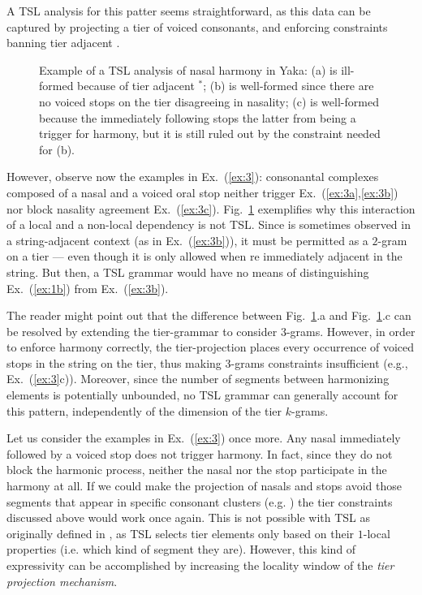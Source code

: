 \documentclass[11pt,a4paper]{article}
\begin{document}
A TSL analysis for this patter seems straightforward, as this data can be captured by projecting a tier of voiced consonants, and enforcing constraints banning tier adjacent  \textipa{[nd]}.

\begin{figure}[t]
\centering
        
        
        \caption{Example of a TSL analysis of nasal harmony in Yaka: (a) is ill-formed because of tier adjacent $^*$\textipa{[nd]}; (b) is well-formed since  there are no voiced stops on the tier disagreeing in nasality; (c) is well-formed because the \textipa{[d]} immediately following \textipa{[n]} stops the latter from being a trigger for harmony, but it is still ruled out by the constraint needed for (b).}
        \label{fig:YAKA1}
        \end{figure}



However, observe now the examples in  Ex.~(\ref{ex:3}): consonantal complexes composed of a nasal and a voiced oral stop neither trigger   Ex.~(\ref{ex:3a},\ref{ex:3b}) nor block nasality agreement   Ex.~(\ref{ex:3c}).
Fig.~\ref{fig:YAKA1} exemplifies why this interaction of a local and a non-local dependency is not TSL\@. 
Since \textipa{[nd]} is sometimes observed in a string-adjacent context (as in Ex.~(\ref{ex:3b})), it must be permitted as a $2$-gram on a tier --- even though it is only allowed when  \textipa{[nd]} re immediately adjacent in the string.
But then,  a TSL grammar would have no means of distinguishing Ex.~(\ref{ex:1b}) from Ex.~(\ref{ex:3b}).

The reader might point out that the difference between Fig.~\ref{fig:YAKA1}.a and Fig.~\ref{fig:YAKA1}.c can be resolved by extending the tier-grammar to consider $3$-grams.
However, in order to enforce harmony correctly, the tier-projection places every occurrence of voiced stops in the string on the tier, thus making $3$-grams constraints insufficient (e.g., Ex.~(\ref{ex:3}c)).
Moreover, since the number of segments between harmonizing elements is potentially unbounded, no TSL grammar can generally account for this pattern, independently of the dimension of the tier $k$-grams.

Let us consider the examples in Ex.~(\ref{ex:3}) once more. 
Any nasal immediately followed by a voiced stop does not trigger harmony. 
In fact, since they do not block the harmonic process, neither the nasal nor the stop participate in the harmony at all.
If we could make the projection of nasals and stops avoid  those segments that appear in specific consonant clusters (e.g. \textipa{[nd]}) the tier constraints discussed above would work once again.
This is not possible with TSL as originally defined in \cite{HeinzRawalTanner}, as TSL selects tier elements only based on their $1$-local properties (i.e. which kind of segment they are). %
However, this kind of expressivity can be accomplished by increasing the locality window of the \emph{tier projection mechanism}. 
\end{document}

